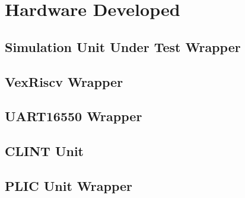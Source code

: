 \chapter{Hardware Developed}

\section{Simulation Unit Under Test Wrapper}

\section{VexRiscv Wrapper}

\section{UART16550 Wrapper}

\section{CLINT Unit}

\section{PLIC Unit Wrapper}